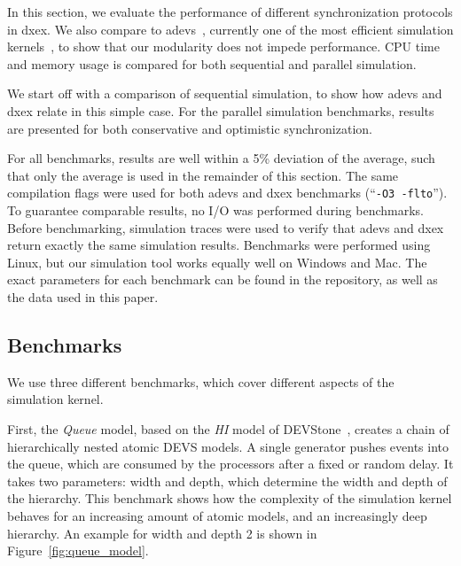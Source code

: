 
In this section, we evaluate the performance of different synchronization protocols in dxex.
We also compare to adevs~\cite{adevs}, currently one of the most efficient simulation kernels~\cite{DEVSSurvey,DEVStoneJournal}, to show that our modularity does not impede performance.
CPU time and memory usage is compared for both sequential and parallel simulation.

We start off with a comparison of sequential simulation, to show how adevs and dxex relate in this simple case.
For the parallel simulation benchmarks, results are presented for both conservative and optimistic synchronization.

For all benchmarks, results are well within a 5\% deviation of the average, such that only the average is used in the remainder of this section.
The same compilation flags were used for both adevs and dxex benchmarks (``\texttt{-O3 -flto}'').
To guarantee comparable results, no I/O was performed during benchmarks.
Before benchmarking, simulation traces were used to verify that adevs and dxex return exactly the same simulation results.
Benchmarks were performed using Linux, but our simulation tool works equally well on Windows and Mac.
The exact parameters for each benchmark can be found in the repository, as well as the data used in this paper. 

\subsection{Benchmarks}
We use three different benchmarks, which cover different aspects of the simulation kernel.

First, the \textit{Queue} model, based on the \textit{HI} model of DEVStone~\cite{DEVStone}, creates a chain of hierarchically nested atomic \textsf{DEVS} models.
A single generator pushes events into the queue, which are consumed by the processors after a fixed or random delay.
It takes two parameters: width and depth, which determine the width and depth of the hierarchy.
This benchmark shows how the complexity of the simulation kernel behaves for an increasing amount of atomic models, and an increasingly deep hierarchy.
An example for width and depth 2 is shown in Figure~\ref{fig:queue_model}.
	
